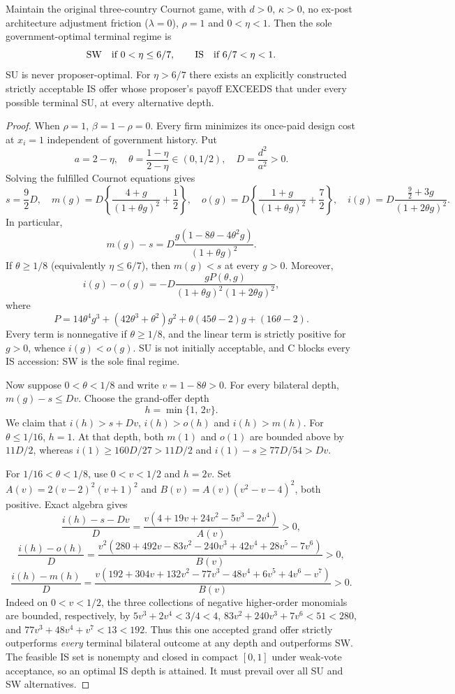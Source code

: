 \begin{proposition}
\label{prop:no-SU-face}
Maintain the original three-country Cournot game, with $d>0$,
$\kappa>0$, no ex-post architecture adjustment friction
($\lambda=0$), $\rho=1$ and $0<\eta<1$. Then the sole
government-optimal terminal regime is
\[
 {\rm SW}\quad\text{if }0<\eta\le6/7,\qquad
 {\rm IS}\quad\text{if }6/7<\eta<1.
\]
SU is never proposer-optimal. For $\eta>6/7$ there exists
an explicitly constructed strictly acceptable IS offer
whose proposer's payoff EXCEEDS that under every
possible terminal SU, at every alternative depth.
\end{proposition}
\begin{proof}
When $\rho=1$, $\beta=1-\rho=0$. Every firm minimizes its
once-paid design cost at $x_i=1$ independent of government
history. Put
\[
 a=2-\eta,\quad
 \theta=\frac{1-\eta}{2-\eta}\in(0,1/2),\quad
 D=\frac{d^2}{a^2}>0.
\]
Solving the fulfilled Cournot equations gives
\[
 s=\frac92D,\quad
 m(g)=D\left\{\frac{4+g}{(1+\theta g)^2}+\frac12\right\},
\quad
 o(g)=D\left\{\frac{1+g}{(1+\theta g)^2}+\frac72\right\},
\quad
 i(g)=D\frac{\frac92+3g}{(1+2\theta g)^2}.
\]
In particular,
\[
 m(g)-s=
 D\frac{g(1-8\theta-4\theta^2g)}{(1+\theta g)^2}.
\]
If $\theta\ge1/8$ (equivalently $\eta\le6/7$), then
$m(g)<s$ at every $g>0$. Moreover,
\[
 i(g)-o(g)=-D\frac{gP(\theta,g)}
 {(1+\theta g)^2(1+2\theta g)^2},
\]
where
\[
 P=14\theta^4g^3+(42\theta^3+\theta^2)g^2+
 \theta(45\theta-2)g+(16\theta-2).
\]
Every term is nonnegative if $\theta\ge1/8$, and the
linear term is strictly positive for $g>0$, whence
$i(g)<o(g)$. SU is not initially acceptable, and
C blocks every IS accession: SW is the sole final regime.

Now suppose $0<\theta<1/8$ and write $v=1-8\theta>0$.
For every bilateral depth, $m(g)-s\le Dv$.
Choose the grand-offer depth
\[
 h=\min\{1,\,2v\}.
\]
We claim that $i(h)>s+Dv$, $i(h)>o(h)$ and $i(h)>m(h)$.
For $\theta\le1/16$, $h=1$. At that depth,
both $m(1)$ and $o(1)$ are bounded above by $11D/2$,
whereas $i(1)\ge160D/27>11D/2$ and
$i(1)-s\ge77D/54>Dv$.

For $1/16<\theta<1/8$, use $0<v<1/2$ and $h=2v$.
Set $A(v)=2(v-2)^2(v+1)^2$ and
$B(v)=A(v)(v^2-v-4)^2$, both positive. Exact algebra gives
\[
 \frac{i(h)-s-Dv}{D}
 =\frac{v(4+19v+24v^2-5v^3-2v^4)}{A(v)}>0,
\]
\[
 \frac{i(h)-o(h)}{D}
 =\frac{v^2(280+492v-83v^2-240v^3+
           42v^4+28v^5-7v^6)}{B(v)}>0,
\]
\[
 \frac{i(h)-m(h)}{D}
 =\frac{v(192+304v+132v^2-77v^3-
          48v^4+6v^5+4v^6-v^7)}{B(v)}>0.
\]
Indeed on $0<v<1/2$, the three collections of negative
higher-order monomials are bounded, respectively, by
$5v^3+2v^4<3/4<4$,
$83v^2+240v^3+7v^6<51<280$,
and $77v^3+48v^4+v^7<13<192$.
Thus this one accepted grand offer strictly outperforms
\emph{every} terminal bilateral outcome at any depth
and outperforms SW. The feasible IS set is nonempty and
closed in compact $[0,1]$ under weak-vote acceptance,
so an optimal IS depth is attained. It must prevail
over all SU and SW alternatives.
\end{proof}

